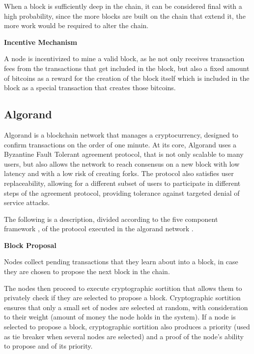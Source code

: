 When a block is sufficiently deep in the chain, it can be considered final with a high probability, since the more blocks are built on the chain that extend it, the more work would be required to alter the chain.


\vspace{0.25cm}

\textbf{Incentive Mechanism}

A node is incentivized to mine a valid block, as he not only receives transaction fees from the transactions that get included in the block, but also a fixed amount of bitcoins as a reward for the creation of the block itself which is included in the block as a special transaction that creates those bitcoins.




\subsection{Algorand}

Algorand \cite{algorand_scale_byz_agreements} \cite{algorand_agreement} is a blockchain network that manages a cryptocurrency, designed to confirm transactions on the order of one minute. At its core, Algorand uses a Byzantine Fault Tolerant agreement protocol, that is not only scalable to many users, but also allows the network to reach consensus on a new block with low latency and with a low risk of creating forks. The protocol also satisfies user replaceability, allowing for a different subset of users to participate in different steps of the agreement protocol, providing tolerance against targeted denial of service attacks.

The following is a description, divided according to the five component framework \cite{survey_bchain_networks}, of the protocol executed in the algorand network \cite{algorand_scale_byz_agreements} \cite{algorand_agreement}.


\vspace{0.5cm}

\textbf{Block Proposal}

Nodes collect pending transactions that they learn about into a block, in case they are chosen to propose the next block in the chain.

The nodes then proceed to execute cryptographic sortition that allows them to privately check if they are selected to propose a block. Cryptographic sortition ensures that only a small set of nodes are selected at random, with consideration to their weight (amount of money the node holds in the system). If a node is selected to propose a block, cryptographic sortition also produces a priority (used as tie breaker when several nodes are selected) and a proof of the node’s ability to propose and of its priority.

